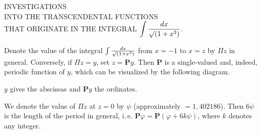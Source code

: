 \clearpage
{}%

\begin{center}
\large INVESTIGATIONS\\
INTO THE TRANSCENDENTAL FUNCTIONS\\
THAT ORIGINATE IN THE INTEGRAL $\displaystyle\int \frac{dx}{\mathord{\surd}(1+x^3)}$.
\end{center}



\noindent\hspace*{\parindent}Denote the value of the integral $\int \frac{dx}{\mathord{\surd}(1+x^3)}$ from $x=-1$ to
$x=z$ by $\Pi z$ in general. Conversely, if $\Pi z=y$, set $z=\boldsymbol{P}y$.
Then $\boldsymbol{P}$ is a single-valued and, indeed, periodic function of $y$, which
can be visualized by the following diagram.

\begin{center}\end{center}

\noindent $y$ gives the abscissas and $\boldsymbol{P}y$ the ordinates.

We denote the value of $\Pi z$ at $z=0$ by $\psi$ (approximately
$=1{,}402186$). Then $6\psi$ is the length of the period in general, i.\,e.
$\boldsymbol{P}\varphi=\boldsymbol{P}(\varphi+6k\psi)$, where $k$ denotes any
integer.
